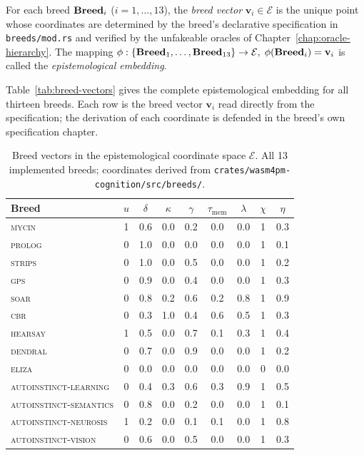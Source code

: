 \begin{definition}
\label{def:breed-vector}
For each breed $\mathbf{Breed}_i$ ($i = 1, \ldots, 13$), the \emph{breed vector}
$\mathbf{v}_i \in \mathcal{E}$ is the unique point whose coordinates are determined by the
breed's declarative specification in \texttt{breeds/mod.rs} and verified by the unfakeable
oracles of Chapter~\ref{chap:oracle-hierarchy}. The mapping
$\phi : \{\mathbf{Breed}_1, \ldots, \mathbf{Breed}_{13}\} \to \mathcal{E},\; \phi(\mathbf{Breed}_i) = \mathbf{v}_i$
is called the \emph{epistemological embedding}.
\end{definition}

Table~\ref{tab:breed-vectors} gives the complete epistemological embedding for all thirteen
breeds. Each row is the breed vector $\mathbf{v}_i$ read directly from the specification;
the derivation of each coordinate is defended in the breed's own specification chapter.

\begin{table}[ht]
\centering
\caption{Breed vectors in the epistemological coordinate space $\mathcal{E}$. All 13 implemented breeds; coordinates derived from \texttt{crates/wasm4pm-cognition/src/breeds/}.}
\label{tab:breed-vectors}
\label{tab:breed-coordinates}
\small
\begin{tabular}{lcccccccc}
\toprule
\textbf{Breed} & $u$ & $\delta$ & $\kappa$ & $\gamma$ & $\tau_{\mathrm{mem}}$ & $\lambda$ & $\chi$ & $\eta$ \\
\midrule
\textsc{mycin}                   & 1 & 0.6 & 0.0 & 0.2 & 0.0 & 0.0 & 1 & 0.3 \\
\textsc{prolog}                  & 0 & 1.0 & 0.0 & 0.0 & 0.0 & 0.0 & 1 & 0.1 \\
\textsc{strips}                  & 0 & 1.0 & 0.0 & 0.5 & 0.0 & 0.0 & 1 & 0.2 \\
\textsc{gps}                     & 0 & 0.9 & 0.0 & 0.4 & 0.0 & 0.0 & 1 & 0.3 \\
\textsc{soar}                    & 0 & 0.8 & 0.2 & 0.6 & 0.2 & 0.8 & 1 & 0.9 \\
\textsc{cbr}                     & 0 & 0.3 & 1.0 & 0.4 & 0.6 & 0.5 & 1 & 0.3 \\
\textsc{hearsay}                 & 1 & 0.5 & 0.0 & 0.7 & 0.1 & 0.3 & 1 & 0.4 \\
\textsc{dendral}                 & 0 & 0.7 & 0.0 & 0.9 & 0.0 & 0.0 & 1 & 0.2 \\
\textsc{eliza}                   & 0 & 0.0 & 0.0 & 0.0 & 0.0 & 0.0 & 0 & 0.0 \\
\textsc{autoinstinct-learning}   & 0 & 0.4 & 0.3 & 0.6 & 0.3 & 0.9 & 1 & 0.5 \\
\textsc{autoinstinct-semantics}  & 0 & 0.8 & 0.0 & 0.2 & 0.0 & 0.0 & 1 & 0.1 \\
\textsc{autoinstinct-neurosis}   & 1 & 0.2 & 0.0 & 0.1 & 0.1 & 0.0 & 1 & 0.8 \\
\textsc{autoinstinct-vision}     & 0 & 0.6 & 0.0 & 0.5 & 0.0 & 0.0 & 1 & 0.3 \\
\bottomrule
\end{tabular}
\end{table}


